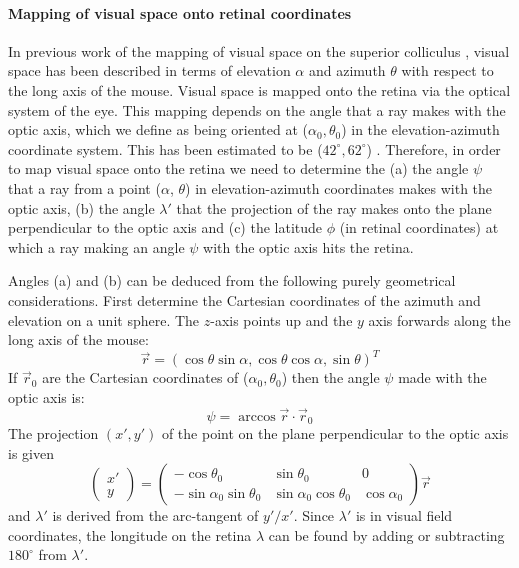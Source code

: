 \documentclass[10pt]{article}
\begin{document}
\paragraph{Mapping of visual space onto retinal coordinates}

In previous work of the mapping of visual space on the superior
colliculus \cite{DragHube76topo}, visual space has been described in
terms of elevation $\alpha$ and azimuth $\theta$ with respect to the
long axis of the mouse. Visual space is mapped onto the retina via the
optical system of the eye. This mapping depends on the angle that a
ray makes with the optic axis, which we define as being oriented at
($\alpha_0, \theta_0$) in the elevation-azimuth coordinate
system. This has been estimated to be ($42^\circ, 62^\circ$)
\cite{DragHube76topo} .
Therefore, in order to map visual space onto the retina we need to
determine the (a) the angle $\psi$ that a ray from a point ($\alpha$,
$\theta$) in elevation-azimuth coordinates makes with the optic axis,
(b) the angle $\lambda'$ that the projection of the ray makes onto the
plane perpendicular to the optic axis and (c) the latitude $\phi$ (in
retinal coordinates) at which a ray making an angle $\psi$ with the
optic axis hits the retina. 

Angles (a) and (b) can be deduced from the following purely geometrical
considerations. First determine the Cartesian coordinates of the
azimuth and elevation on a unit sphere. The $z$-axis points up and the
$y$ axis forwards along the long axis of the mouse:
\begin{equation}
  \label{retistruct_plos:eq:5}
  \vec{r} = (\cos\theta\sin\alpha, \cos\theta\cos\alpha, \sin\theta)^T
\end{equation}
If $\vec{r}_0$ are the Cartesian coordinates of ($\alpha_0, \theta_0$)
then the angle $\psi$ made with the optic axis is:
\begin{equation}
  \label{retistruct_plos:eq:6}
  \psi=\arccos \vec{r}\cdot\vec{r}_0
\end{equation}
The projection $(x', y')$ of the point on the plane perpendicular to
the optic axis is given
\begin{equation}
  \label{retistruct_plos:eq:7}
  \left(
    \begin{array}{c}
      x' \\ y
    \end{array}
    \right) =     
    \left(
    \begin{array}{ccc}
      -\cos\theta_0 & \sin\theta_0 & 0  \\ 
      -\sin\alpha_0\sin\theta_0 & \sin\alpha_0\cos\theta_0 & \cos\alpha_0
    \end{array}
    \right) \vec{r}
\end{equation}
and $\lambda'$ is derived from the arc-tangent of $y'/x'$. Since
$\lambda'$ is in visual field coordinates, the longitude on the retina
$\lambda$ can be found by adding or subtracting $180^\circ$ from
$\lambda'$.
\end{document}
